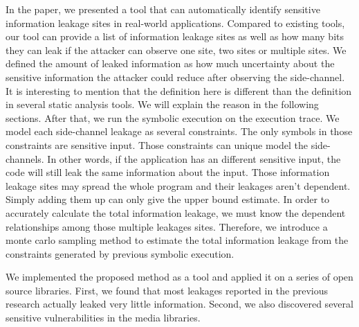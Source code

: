 In the paper, we presented a tool that can automatically identify sensitive information leakage sites in real-world applications. Compared to existing tools, our tool can provide a list of information leakage sites as well as how many bits they can leak if the attacker can observe one site, two sites or multiple sites. We defined the amount of leaked information as how much uncertainty about the sensitive information the attacker could reduce after observing the side-channel. It is interesting to mention that the definition here is different than the definition in several static analysis tools. We will explain the reason in the following sections. After that, we run the symbolic execution on the execution trace. We model each side-channel leakage as several constraints. The only symbols in those constraints are sensitive input. Those constraints can unique model the side-channels. In other words, if the application has an different sensitive input, the code will still leak the same information about the input.  Those information leakage sites may spread the whole program and their leakages aren’t dependent. Simply adding them up can only give the upper bound estimate. In order to accurately calculate the total information leakage, we must know the dependent relationships among those multiple leakages sites. Therefore, we introduce a monte carlo sampling method to estimate the total information leakage from the constraints generated by previous symbolic execution. 

We implemented the proposed method as a tool and applied it on a series of open source libraries. First, we found that most leakages reported in the previous research actually leaked very little information. Second, we also discovered several sensitive vulnerabilities in the media libraries. 
